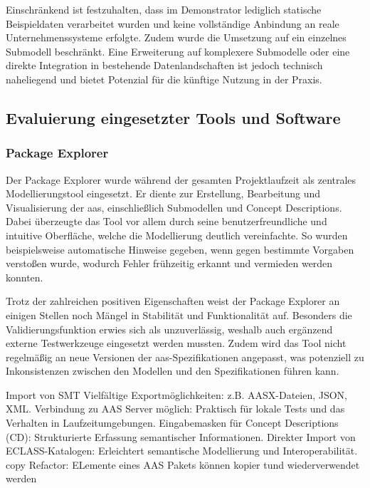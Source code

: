 Einschränkend ist festzuhalten, dass im Demonstrator lediglich statische Beispieldaten verarbeitet wurden und keine vollständige Anbindung an reale Unternehmenssysteme erfolgte. 
Zudem wurde die Umsetzung auf ein einzelnes Submodell beschränkt. 
Eine Erweiterung auf komplexere Submodelle oder eine direkte Integration in bestehende Datenlandschaften ist jedoch technisch naheliegend und bietet Potenzial für die künftige Nutzung in der Praxis. 



\subsection{Evaluierung eingesetzter Tools und Software}
\subsubsection{Package Explorer}

Der Package Explorer wurde während der gesamten Projektlaufzeit als zentrales Modellierungstool eingesetzt. 
Er diente zur Erstellung, Bearbeitung und Visualisierung der \acs{aas}, einschließlich Submodellen und Concept Descriptions.
Dabei überzeugte das Tool vor allem durch seine benutzerfreundliche und intuitive Oberfläche, welche die Modellierung deutlich vereinfachte. 
So wurden beispielsweise automatische Hinweise gegeben, wenn gegen bestimmte Vorgaben verstoßen wurde, wodurch Fehler frühzeitig erkannt und vermieden werden konnten.

Trotz der zahlreichen positiven Eigenschaften weist der Package Explorer an einigen Stellen noch Mängel in Stabilität und Funktionalität auf. 
Besonders die Validierungsfunktion erwies sich als unzuverlässig, weshalb auch ergänzend externe Testwerkzeuge eingesetzt werden mussten. 
Zudem wird das Tool nicht regelmäßig an neue Versionen der \acs{aas}-Spezifikationen angepasst, was potenziell zu Inkonsistenzen zwischen den Modellen und den Spezifikationen führen kann.



Import von SMT
Vielfältige Exportmöglichkeiten: z.B. AASX-Dateien, JSON, XML.
Verbindung zu AAS Server möglich: Praktisch für lokale Tests und das Verhalten in Laufzeitumgebungen.
Eingabemasken für Concept Descriptions (CD): Strukturierte Erfassung semantischer Informationen.
Direkter Import von ECLASS-Katalogen: Erleichtert semantische Modellierung und Interoperabilität.
copy Refactor: ELemente eines AAS Pakets können kopier tund wiederverwendet werden





